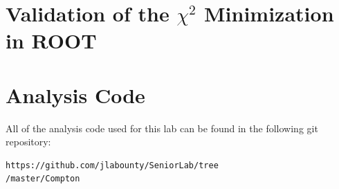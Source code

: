 \documentclass[%
 reprint,
 amsmath,amssymb,
 aps,
 pra,
]{revtex4-1}
\begin{document}
\begin{appendix}
\section{Validation of the $\chi^2$ Minimization in ROOT} \label{section:root}

\section{Analysis Code} \label{section:analysis_code}

All of the analysis code used for this lab can be found in the following git repository: 
\begin{verbatim}
https://github.com/jlabounty/SeniorLab/tree
/master/Compton
\end{verbatim}

\end{appendix}
\end{document}
